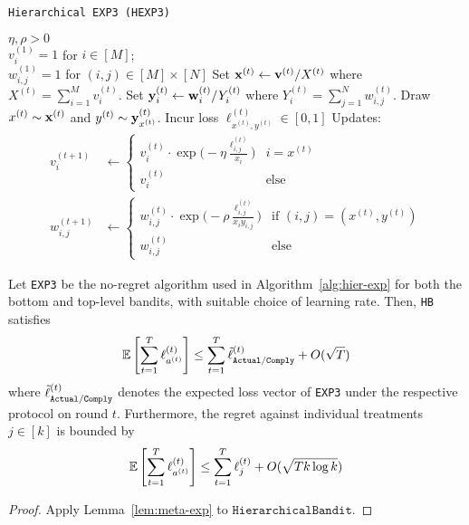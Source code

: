 \begin{algorithm}[tb]
   \caption{\texttt{Hierarchical EXP3 (HEXP3)}}
   \label{alg:meta-exp2}
   \begin{algorithmic}   
    $\eta,\rho>0$\\
   	 $v^{(1)}_{i}=1$ for $i\in[M]$;\\ 
   	 $w^{(1)}_{i,j}=1$ for $(i,j)\in[M]\times[N]$
	\STATE Set ${\mathbf x}^{(t)} \leftarrow {\mathbf v}^{(t)}/X^{(t)}$ where $X^{(t)} = \sum_{i=1}^M v^{(t)}_{i}$.
	\STATE Set ${\mathbf y}^{(t)}_{i} \leftarrow {\mathbf w}^{(t)}_{i}/Y^{(t)}_{i}$ where $Y^{(t)}_{i} = \sum_{j=1}^N w^{(t)}_{i,j}$.
	\STATE Draw $x^{(t)}\sim {\mathbf x}^{(t)}$ and $y^{(t)}\sim {\mathbf y}^{(t)}_{x^{(t)}}$.
	\STATE Incur loss $\ell^{(t)}_{x^{(t)},y^{(t)}}\in [0,1]$ 
	\STATE Updates:
	\begin{align}
		v^{(t+1)}_i & \leftarrow \begin{cases}
			v^{(t)}_{i}\cdot 
			\exp\big(-\eta\frac{\ell^{(t)}_{i,j}}{x_i}\big) & i=x^{(t)} \\
			v^{(t)}_{i} & \text{else}
		\end{cases}		 
		\\
		w^{(t+1)}_{i,j} & \leftarrow \begin{cases}
			w^{(t)}_{i,j}\cdot \exp\big(-\rho\frac{\ell^{(t)}_{i,j}}{x_iy_{i,j}}\big) 
			& \text{if }(i,j)=(x^{(t)}, y^{(t)}) \\
			w^{(t)}_{i,j} &\text{else}
		\end{cases}
	\end{align}
   	\ENDFOR
   	\end{algorithmic}
\end{algorithm}%


\begin{thm}\label{thm:cexp}\eod
	Let \texttt{EXP3} be the no-regret algorithm used in Algorithm~\ref{alg:hier-exp} for both the bottom and top-level bandits, with suitable choice of learning rate. Then, \texttt{HB} satisfies
	\begin{equation}
		\operatorname*{\mathbb E}\left[\sum_{t=1}^T\ell^{(t)}_{a^{(t)}}\right]
		\leq \sum_{t=1}^T \tilde{\ell}^{(t)}_{{\texttt{Actual}}/{\texttt{Comply}}}
		+ O(\sqrt{T})
	\end{equation}
	where $\tilde{\ell}^{(t)}_{{\texttt{Actual}}/{\texttt{Comply}}}$ denotes the expected loss vector of \texttt{EXP3} under the respective protocol on round $t$. 
	Furthermore, the regret against individual treatments $j\in[k]$ is bounded by
	\begin{equation}
		\operatorname*{\mathbb E}\left[\sum_{t=1}^{T} \ell^{(t)}_{a^{(t)}}\right]
		\leq \sum_{t=1}^T\ell^{(t)}_{j}
		+ O(\sqrt{T k\log k})
	\end{equation}
\end{thm}

\begin{proof}
	Apply Lemma~\ref{lem:meta-exp} to $\texttt{HierarchicalBandit}$.
\end{proof}



